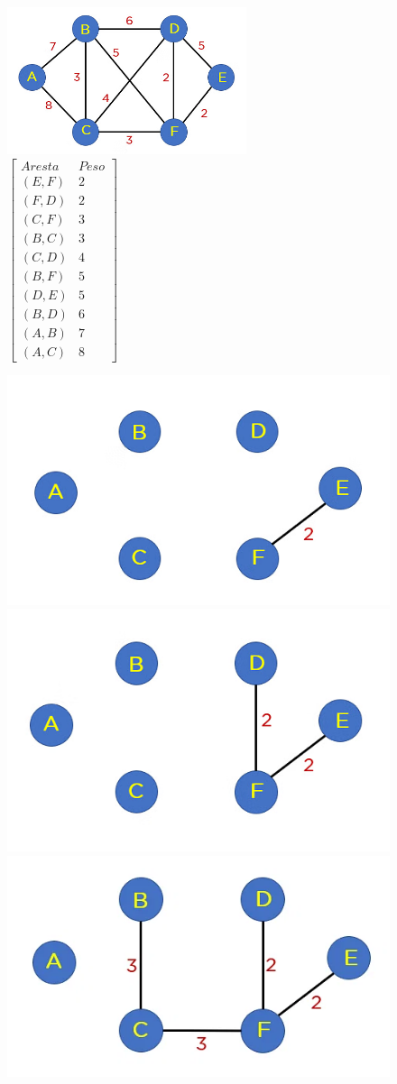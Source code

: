 \documentclass{article}
\begin{document}
\begin{figure}
    \caption{$\left[
    \begin{array}{cccc}
    Aresta & Peso\\
    (E,F) & 2\\
    (F,D) & 2 \\
    (C,F) & 3 \\
    (B,C) & 3\\
    (C,D) & 4 \\
    (B,F) &  5\\
    (D,E) & 5\\
    (B,D) & 6\\
    (A,B) & 7\\
    (A,C) & 8
    \end{array}
    \right]$}
    \includegraphics[width=7cm]{Kruskal/inicializacao.png}
\end{figure}

\begin{figure}[htp]

\centering
\includegraphics[width=.32\textwidth]{Kruskal/iter1.png}\hfill
\includegraphics[width=.32\textwidth]{Kruskal/iter2.png}\hfill
\includegraphics[width=.32\textwidth]{Kruskal/iter3.png}

\end{figure}
\end{document}
